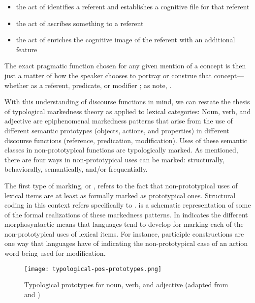 \begin{itemize}
  \item the act of  identifies a referent and establishes a cognitive file for that referent
  \item the act of  ascribes something to a referent
  \item the act of  enriches the cognitive image of the referent with an additional feature
\end{itemize}

\noindent The exact pragmatic function chosen for any given mention of a concept is then just a matter of how the speaker chooses to portray or construe that concept—whether as a referent, predicate, or modifier \parencite[100]{Croft1991}; as \citeauthor{CroftLier2012} note, .

With this understanding of discourse functions in mind, we can restate the thesis of typological markedness theory as applied to lexical categories: Noun, verb, and adjective are epiphenomenal markedness patterns that arise from the use of different semantic prototypes (objects, actions, and properties) in different discourse functions (reference, predication, modification). Uses of these semantic classes in non-prototypical functions are typologically marked. As mentioned, there are four ways in non-prototypical uses can be marked: structurally, behaviorally, semantically, and/or frequentially.

The first type of marking,  or , refers to the fact that non-prototypical uses of lexical items are at least as formally marked as prototypical ones. Structural coding in this context refers specifically to .  is a schematic representation of some of the formal realizations of these markedness patterns. In indicates the different morphosyntactic means that languages tend to develop for marking each of the non-prototypical uses of lexical items. For instance, participle constructions are one way that languages have of indicating the non-prototypical case of an action word being used for modification.

\begin{figure}[h!]
  \centering
  \texttt{[image: typological-pos-prototypes.png]}
  \caption[Typological prototypes for noun, verb, and adjective]{Typological prototypes for noun, verb, and adjective (adapted from \textcite[89]{Croft2000} and \textcite[62]{Lier2012})}
  \label{fig:typological-pos-prototypes}
\end{figure}

